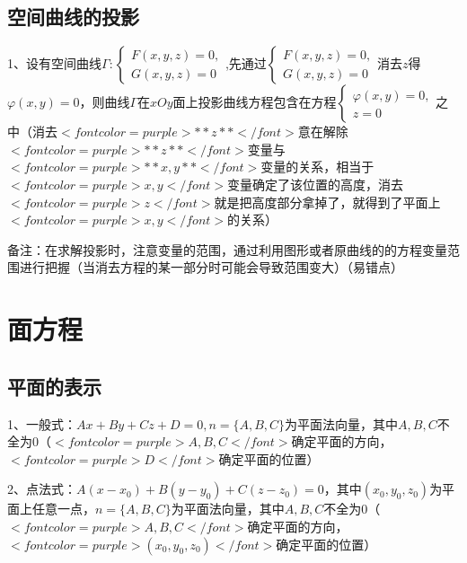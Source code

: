 \subsection{空间曲线的投影}

1、设有空间曲线$ \Gamma:\left\{\begin{array}{l}F(x, y, z)=0, \\ G(x, y, z)=0\end{array}\right. $,先通过$ \left\{\begin{array}{l}F(x, y, z)=0, \\ G(x, y, z)=0\end{array}\right. $消去$ z $得$ \varphi(x, y)=0 $，则曲线$ \Gamma $在$ x O y $面上投影曲线方程包含在方程$ \left\{\begin{array}{l}\varphi(x, y)=0, \\ z=0\end{array}\right. $之中（消去$ <font color=purple>**z**</font> $意在解除$ <font color=purple>**z**</font> $变量与$ <font color=purple>**x,y**</font> $变量的关系，相当于$ <font color=purple>x,y</font> $变量确定了该位置的高度，消去$ <font color=purple>z</font> $就是把高度部分拿掉了，就得到了平面上$ <font color=purple>x,y</font> $的关系）

备注：在求解投影时，注意变量的范围，通过利用图形或者原曲线的的方程变量范围进行把握（当消去方程的某一部分时可能会导致范围变大）（易错点）

\section{面方程}



\subsection{平面的表示}

1、一般式：$ A x+B y+C z+D=0, n=\{A, B, C\} $为平面法向量，其中$ A, B, C $不全为0（$ <font color=purple>A,B,C</font> $确定平面的方向，$ <font color=purple>D</font> $确定平面的位置）

2、点法式：$ A\left(x-x_{0}\right)+B\left(y-y_{0}\right)+C\left(z-z_{0}\right)=0 $，其中$ \left(x_{0}, y_{0}, z_{0}\right) $为平面上任意一点，$ n=\{A, B, C\} $为平面法向量，其中$ A, B, C $不全为0（$ <font color=purple>A,B,C</font> $确定平面的方向，$ <font color=purple>\left(x_{0}, y_{0}, z_{0}\right)</font> $确定平面的位置）

